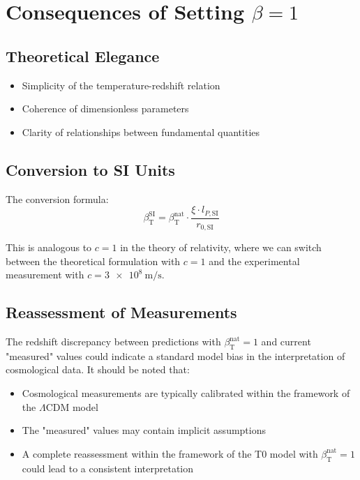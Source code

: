 \documentclass[12pt,a4paper]{article}
\newcommand{\betaT}{\beta_{\text{T}}}
\begin{document}
	\section{Consequences of Setting \(\beta = 1\)}
	
	\subsection{Theoretical Elegance}
	
	\begin{itemize}
		\item Simplicity of the temperature-redshift relation
		\item Coherence of dimensionless parameters
		\item Clarity of relationships between fundamental quantities
	\end{itemize}
	
	\subsection{Conversion to SI Units}
	
	The conversion formula:
	\begin{equation}
		\betaT^{\text{SI}} = \betaT^{\text{nat}} \cdot \frac{\xi \cdot l_{P,\text{SI}}}{r_{0,\text{SI}}}
	\end{equation}
	
	This is analogous to \(c = 1\) in the theory of relativity, where we can switch between the theoretical formulation with \(c = 1\) and the experimental measurement with \(c = \SI{3e8}{\meter\per\second}\).
	
	\subsection{Reassessment of Measurements}
	
	The redshift discrepancy between predictions with \(\betaT^{\text{nat}} = 1\) and current "measured" values could indicate a standard model bias in the interpretation of cosmological data. It should be noted that:
	\begin{itemize}
		\item Cosmological measurements are typically calibrated within the framework of the \(\Lambda\)CDM model
		\item The "measured" values may contain implicit assumptions
		\item A complete reassessment within the framework of the T0 model with \(\betaT^{\text{nat}} = 1\) could lead to a consistent interpretation
	\end{itemize}
	
\end{document}
